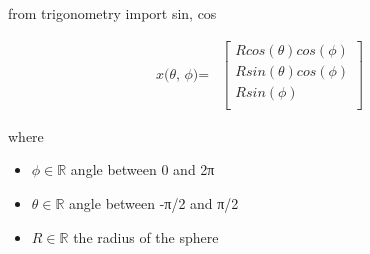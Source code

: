 \documentclass[12pt]{article}
\begin{document}
from trigonometry import sin, cos

\begin{align*}
\textit{x(θ, ϕ)} = & \begin{bmatrix}
\textit{R}cos\left( \textit{θ} \right)cos\left( \textit{ϕ} \right)\\
\textit{R}sin\left( \textit{θ} \right)cos\left( \textit{ϕ} \right)\\
\textit{R}sin\left( \textit{ϕ} \right)\\
\end{bmatrix}
\end{align*}

where
\begin{itemize}
\item $\textit{ϕ} \in \mathbb{{R}}$ angle between 0 and 2π
\item $\textit{θ} \in \mathbb{{R}}$ angle between -π/2 and π/2
\item $\textit{R} \in \mathbb{{R}}$ the radius of the sphere
\end{itemize}
\end{document}
